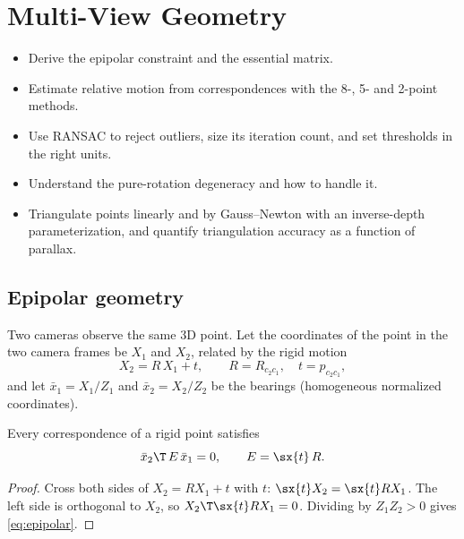 \chapter{Multi-View Geometry}
\label{ch:multiview}

\begin{objectives}
\begin{itemize}
  \item Derive the epipolar constraint and the essential matrix.
  \item Estimate relative motion from correspondences with the 8-, 5- and 2-point methods.
  \item Use RANSAC to reject outliers, size its iteration count, and set thresholds in the right units.
  \item Understand the pure-rotation degeneracy and how to handle it.
  \item Triangulate points linearly and by Gauss--Newton with an inverse-depth parameterization, and quantify
        triangulation accuracy as a function of parallax.
\end{itemize}
\end{objectives}

\section{Epipolar geometry}

Two cameras observe the same 3D point. Let the coordinates of the point in the two camera frames be $X_1$ and
$X_2$, related by the rigid motion
\begin{equation}
  X_2 = R\,X_1 + t, \qquad R = R_{c_2c_1},\quad t = p_{c_2c_1},
\end{equation}
and let $\bar x_1 = X_1/Z_1$ and $\bar x_2 = X_2/Z_2$ be the bearings (homogeneous normalized coordinates).

\begin{theorem}
\label{thm:epipolar}
Every correspondence of a rigid point satisfies
\begin{equation}
  \bar x_2\T\,E\,\bar x_1 = 0, \qquad E = \sx{t}\,R .
  \label{eq:epipolar}
\end{equation}
\end{theorem}
\begin{proof}
Cross both sides of $X_2 = RX_1 + t$ with $t$: $\sx{t}X_2 = \sx{t}RX_1$. The left side is orthogonal to $X_2$, so
$X_2\T\sx{t}RX_1 = 0$. Dividing by $Z_1Z_2 > 0$ gives \eqref{eq:epipolar}.
\end{proof}


